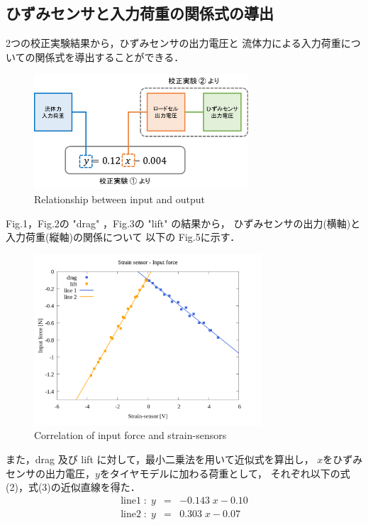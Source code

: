 \documentclass[twocolumn,a4j]{jsarticle}
\begin{document}
\subsection{ひずみセンサと入力荷重の関係式の導出}
2つの校正実験結果から，ひずみセンサの出力電圧と
流体力による入力荷重についての関係式を導出することができる．\\
\begin{figure}[htbp]
    \footnotesize
    \begin{center}
        \includegraphics[width=80mm]{../images/image_03.png}
        \caption{Relationship between input and output}
    \end{center}
\end{figure}

Fig.1，Fig.2の "drag" ，Fig.3の "lift" の結果から，
ひずみセンサの出力(横軸)と入力荷重(縦軸)の関係について
以下の Fig.5に示す．\par
\begin{figure}[htbp]
    \footnotesize
    \begin{center}
        \includegraphics[width=85mm]{../images/08_strainsensor-forces&line.png}
        \caption{Correlation of input force and strain-sensors}
    \end{center}
\end{figure}
また，drag 及び lift に対して，最小二乗法を用いて近似式を算出し，
$x$をひずみセンサの出力電圧，$y$をタイヤモデルに加わる荷重として，
それぞれ以下の式(2)，式(3)の近似直線を得た．
\begin{eqnarray}
    \mathrm{line 1} \; : \; y &=& -0.143 \; x - 0.10\\
    \mathrm{line 2} \; : \; y &=& 0.303 \; x - 0.07
\end{eqnarray}
\end{document}
